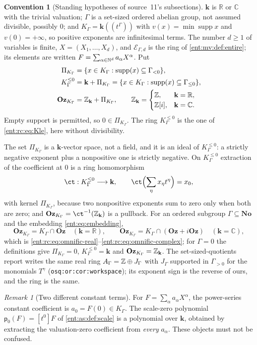 \documentclass[11pt]{article}
\theoremstyle{plain}
\theoremstyle{plain}
\theoremstyle{plain}
\theoremstyle{definition}
\theoremstyle{definition}
\newtheorem{convention}[convention]{Convention}
\theoremstyle{definition}
\theoremstyle{definition}
\theoremstyle{remark}
\newtheorem{remark}[remark]{Remark}
\newcommand{\C}{\mathbb C}\newcommand{\R}{\mathbb R}
\newcommand{\No}{\mathbf{No}}
\newcommand{\K}{K_\Gamma}\newcommand{\KD}{K_\Delta}
\DeclareMathOperator{\supp}{supp}\DeclareMathOperator{\lc}{lc}
\newcommand{\kk}{\mathbf k}\newcommand{\PP}{\mathbb P}
\newcommand{\Oz}{\mathbf{Oz}}\newcommand{\Ed}{\mathcal E_{\Gamma,d}}
\newcommand{\Kle}{K_\Gamma^{\le0}}\DeclareMathOperator{\Jac}{Jac}
\newcommand{\Zk}{\Z_{\kk}}\newcommand{\OzK}{\Oz_{\K}}
\newcommand{\PiK}{\Pi_{\K}}\newcommand{\pg}{\mathsf p}
\begin{document}
\begin{convention}[Standing hypotheses of source~11's subsections]
\label{ent:as:conv:standing}
$\kk$ is $\R$ or $\C$ with the trivial valuation; $\Gamma$ is a set-sized
ordered abelian group, not assumed divisible, possibly $0$; and
$\K=\kk((t^\Gamma))$ with $v(x)=\min\supp x$ and $v(0)=+\infty$, so positive
exponents are infinitesimal terms. The number $d\ge1$ of variables is finite,
$X=(X_1,\ldots,X_d)$, and $\Ed$ is the ring of \cref{ent:mv:def:entire}; its
elements are written $F=\sum_{\alpha\in\mathbb N^d}a_\alpha X^\alpha$. Put
\begin{align}
 \PiK&=\{x\in\K:\supp(x)\subseteq\Gamma_{<0}\},\label{ent:as:eq:pi}\\
 \Kle&=\kk+\PiK=\{x\in\K:\supp(x)\subseteq\Gamma_{\le0}\},\label{ent:as:eq:B}\\
 \OzK&=\Zk+\PiK,\qquad
 \Zk=\begin{cases}\Z,&\kk=\R,\\ \Z[i],&\kk=\C.\end{cases}\label{ent:as:eq:A}
\end{align}
Empty support is permitted, so $0\in\PiK$. The ring $\Kle$ is the one of
\eqref{ent:rc:eq:Kle}, here without divisibility.
\end{convention}

The set $\PiK$ is a $\kk$-vector space, not a field, and it is an ideal of
$\Kle$: a strictly negative exponent plus a nonpositive one is strictly
negative. On $\Kle$ extraction of the coefficient at $0$ is a ring
homomorphism
\[
 \ct:\Kle\longrightarrow\kk,\qquad
 \ct\Bigl(\sum_\eta x_\eta t^\eta\Bigr)=x_0,
\]
with kernel $\PiK$, because two nonpositive exponents sum to zero only when
both are zero; and $\OzK=\ct^{-1}(\Zk)$ is a pullback. For an ordered subgroup
$\Gamma\subseteq\No$ and the embedding \eqref{ent:eq:embedding},
\[
 \OzK=\K\cap\Oz\quad(\kk=\R),\qquad
 \OzK=\K\cap(\Oz+i\Oz)\quad(\kk=\C),
\]
which is \eqref{ent:rc:eq:omnific-real}--\eqref{ent:rc:eq:omnific-complex}; for
$\Gamma=0$ the definitions give $\PiK=0$, $\Kle=\kk$ and $\OzK=\Zk$. The
set-sized-quotients report writes the same real ring $A_\Gamma=\mathbb Z\oplus
J_\Gamma$ with $J_\Gamma$ supported in $\Gamma_{>0}$ for the monomials $T^\gamma$
(\texttt{osq:or:cor:workspace}); its exponent sign is the reverse of ours, and
the ring is the same.

\begin{remark}[Two different constant terms]\label{ent:as:rem:two-constants}
For $F=\sum_\alpha a_\alpha X^\alpha$, the power-series constant coefficient is
$a_0=F(0)\in\K$. The scale-zero polynomial $\pg_0(F)=[t^0]F$ of
\cref{ent:as:def:scale} is a polynomial over $\kk$, obtained by extracting the
valuation-zero coefficient from \emph{every} $a_\alpha$. These objects must not
be confused.
\end{remark}
\end{document}
